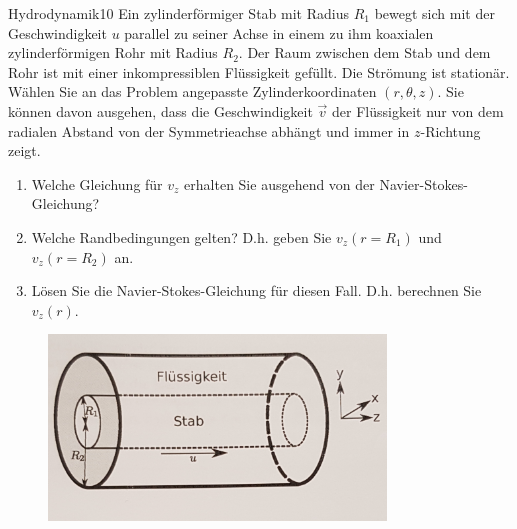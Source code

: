 \begin{exercise}{Hydrodynamik}{10}
  Ein zylinderförmiger Stab mit Radius $R_1$ bewegt sich mit der Geschwindigkeit $u$
  parallel zu seiner Achse in einem zu ihm koaxialen zylinderförmigen Rohr mit Radius
  $R_2$. Der Raum zwischen dem Stab und dem Rohr ist mit einer inkompressiblen
  Flüssigkeit gefüllt. Die Strömung ist stationär.\\
  Wählen Sie an das Problem angepasste Zylinderkoordinaten $(r, \theta, z)$. Sie
  können davon ausgehen, dass die Geschwindigkeit $\vec{v}$ der Flüssigkeit nur von
  dem radialen Abstand von der Symmetrieachse abhängt und immer in $z$-Richtung zeigt.

  \begin{enumerate}
    \item Welche Gleichung für $v_z$ erhalten Sie ausgehend von der Navier-Stokes-Gleichung?
    \item Welche Randbedingungen gelten? D.h. geben Sie $v_z(r = R_1)$ und $v_z(r = R_2)$ an.
    \item Lösen Sie die Navier-Stokes-Gleichung für diesen Fall. D.h. berechnen Sie $v_z(r)$.
  \end{enumerate}

  \begin{figure}[h]
    \centering
    \includegraphics[width=0.8\textwidth]{Skizze_Navier_Stokes.jpg}
    \label{fig:Skizze_Koaxial}
  \end{figure}

\end{exercise}
